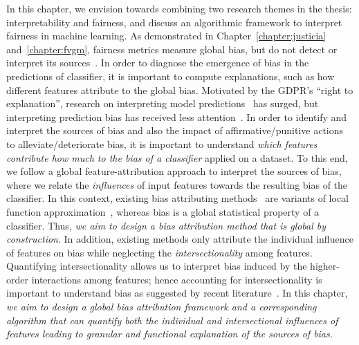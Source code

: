 In this chapter, we envision towards combining two research themes in the thesis: interpretability and fairness, and discuss an algorithmic framework to interpret  fairness in machine learning.
As demonstrated in Chapter~\ref{chapter:justicia} and~\ref{chapter:fvgm}, fairness metrics measure global bias, but do not detect or interpret its sources~\cite{begley2020explainability,lundberg2020explaining,pan2021explaining}.
In order to diagnose the emergence of bias in the predictions of classifier, it is important to compute explanations, such as how different features attribute to the global bias. Motivated by the GDPR's ``right to explanation'', research on interpreting model predictions~\cite{ribeiro2016should,lundberg2017unified,lundberg2020local2global} has surged, but interpreting prediction bias has received less attention~\cite{begley2020explainability,lundberg2020explaining}. In order to identify and interpret the sources of bias and also the impact of affirmative/punitive actions to alleviate/deteriorate bias, it is important to understand \textit{which features contribute how much to the bias of a classifier} applied on a dataset. To this end, we follow a global feature-attribution approach to interpret the sources of bias, where we relate the \emph{influences} of input features towards the resulting bias of the classifier. In this context, existing bias attributing methods~\cite{begley2020explainability,lundberg2020explaining} are variants of local function approximation~\cite{sliwinski2019axiomatic}, whereas bias is a global statistical property of a classifier. Thus, \textit{we aim to design a bias attribution method that is global by construction}. In addition, existing methods only attribute the individual influence of features on bias while neglecting the \textit{intersectionality} among features. Quantifying intersectionality allows us to interpret bias induced by the higher-order interactions among features; hence accounting for intersectionality is important to understand bias as suggested by recent literature~\cite{buolamwini2018gender,wang2022towards}. 
In this chapter, \textit{we aim to design a global bias attribution framework and a corresponding algorithm that can quantify both the individual and intersectional influences of features leading to granular and functional explanation of the sources of bias.}



